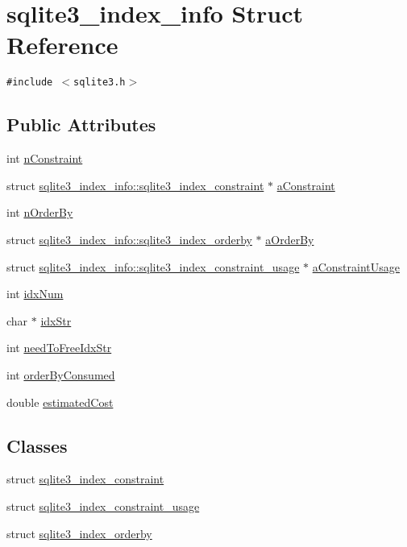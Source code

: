\hypertarget{structsqlite3__index__info}{
\section{sqlite3\_\-index\_\-info Struct Reference}
\label{structsqlite3__index__info}
}
{\tt \#include $<$sqlite3.h$>$}

\subsection*{Public Attributes}
\begin{CompactItemize}
\item 
int \hyperlink{structsqlite3__index__info_e861993a30ce914a5214eab2579d935a}{nConstraint}
\item 
struct \hyperlink{structsqlite3__index__info_1_1sqlite3__index__constraint}{sqlite3\_\-index\_\-info::sqlite3\_\-index\_\-constraint} $\ast$ \hyperlink{structsqlite3__index__info_634aa93834e2b47acf34454746c0f248}{aConstraint}
\item 
int \hyperlink{structsqlite3__index__info_3ef850fdc57eddbc8189fe84d0a9044e}{nOrderBy}
\item 
struct \hyperlink{structsqlite3__index__info_1_1sqlite3__index__orderby}{sqlite3\_\-index\_\-info::sqlite3\_\-index\_\-orderby} $\ast$ \hyperlink{structsqlite3__index__info_6823a68979e19d8e332389361e920ef9}{aOrderBy}
\item 
struct \hyperlink{structsqlite3__index__info_1_1sqlite3__index__constraint__usage}{sqlite3\_\-index\_\-info::sqlite3\_\-index\_\-constraint\_\-usage} $\ast$ \hyperlink{structsqlite3__index__info_79b8a969dd7d582fc2ea3c0fbc5adb56}{aConstraintUsage}
\item 
int \hyperlink{structsqlite3__index__info_fcee17707a1c147fbd55c23c807fdae3}{idxNum}
\item 
char $\ast$ \hyperlink{structsqlite3__index__info_1a9935e997bd6e3cce048534da7506a7}{idxStr}
\item 
int \hyperlink{structsqlite3__index__info_5410066c067c3891cdf165c70cc4d6b1}{needToFreeIdxStr}
\item 
int \hyperlink{structsqlite3__index__info_5515d9de0f37f68d7e0930c20a668b29}{orderByConsumed}
\item 
double \hyperlink{structsqlite3__index__info_a8b4fe1d2ee38aab57ba5e1da00d7830}{estimatedCost}
\end{CompactItemize}
\subsection*{Classes}
\begin{CompactItemize}
\item 
struct \hyperlink{structsqlite3__index__info_1_1sqlite3__index__constraint}{sqlite3\_\-index\_\-constraint}
\item 
struct \hyperlink{structsqlite3__index__info_1_1sqlite3__index__constraint__usage}{sqlite3\_\-index\_\-constraint\_\-usage}
\item 
struct \hyperlink{structsqlite3__index__info_1_1sqlite3__index__orderby}{sqlite3\_\-index\_\-orderby}
\end{CompactItemize}


